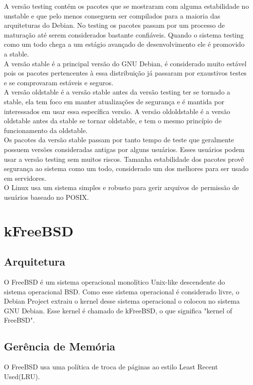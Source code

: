 \documentclass[conference]{IEEEtran}
\begin{document}
A versão testing contém os pacotes que se mostraram com alguma estabilidade no unstable e que pelo menos conseguem ser compilados para a maioria das arquiteturas do Debian. No testing os pacotes passam por um processo de maturação até serem considerados bastante confiáveis. Quando o sistema testing como um todo chega a um estágio avançado de desenvolvimento ele é promovido a stable.\\

A versão stable é a principal versão do GNU Debian, é considerado muito estável pois os pacotes pertencentes à essa distribuição já passaram por exaustivos testes e se comprovaram estáveis e seguros.\\

A versão oldstable é a versão stable antes da versão testing ter se tornado a stable, ela tem foco em manter atualizações de segurança e é mantida por interessados em usar essa específica versão. A versão oldoldstable é a versão oldstable antes da stable se tornar oldstable, e tem o mesmo princípio de funcionamento da oldstable.\\

Os pacotes da versão stable passam por tanto tempo de teste que geralmente possuem versões consideradas antigas por alguns usuários. Esses usuários podem usar a versão testing sem muitos riscos. Tamanha estabilidade dos pacotes provê segurança ao sistema como um todo, considerado um dos melhores para ser usado em servidores\cite{DebianVersions}.\\

O Linux usa um sistema simples e robusto para gerir arquivos de permissão de usuários baseado no POSIX\cite{GruposUsuarioLinux}.\\
\section{kFreeBSD}\label{sec:BSD}
\subsection{Arquitetura}\label{sec:BSDArq}
O FreeBSD é um sistema operacional monolítico Unix-like descendente do sistema operacional BSD. Como esse sistema operacional é considerado livre, o Debian Project extraiu o kernel desse sistema operacional o colocou no sistema GNU Debian. Esse kernel é chamado de kFreeBSD, o que significa "kernel of FreeBSD".\cite{Debian-kFreeBSD-wiki}
\subsection{Gerência de Memória}\label{sec:BSDMem}
O FreeBSD usa uma política de troca de páginas ao estilo Least Recent Used(LRU).\cite{FreeBsdArc}
\end{document}
